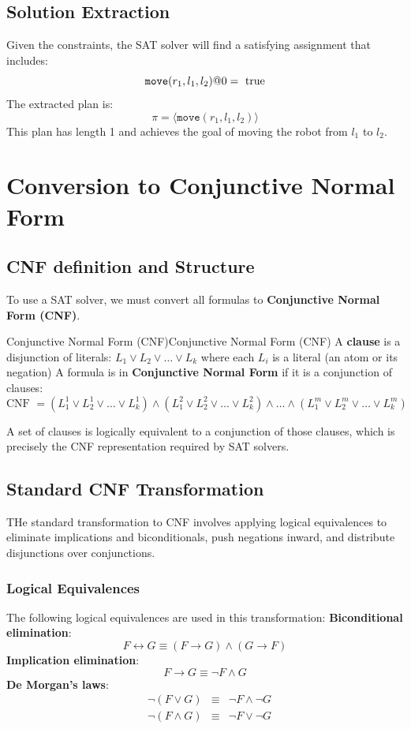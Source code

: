 \documentclass[a4paper]{article}
\theoremstyle{definition}
\begin{document}
\subsection{Solution Extraction}
Given the constraints, the SAT solver will find a satisfying assignment that includes:
\[
  \texttt{move}(r_1,l_1,l_2)\symbol{64}0 = \text{ true}
\]
The extracted plan is:
\[
  \pi = \langle \texttt{move}(r_1,l_1,l_2) \rangle
\]
This plan has length 1 and achieves the goal of moving the robot from \( l_1 \) to \( l_2 \).
\section{Conversion to Conjunctive Normal Form}
\subsection{CNF definition and Structure}
To use a SAT solver, we must convert all formulas to \textbf{Conjunctive Normal Form (CNF)}.
\begin{definition}{Conjunctive Normal Form (CNF)}{Conjunctive Normal Form (CNF)}
A \textbf{clause} is a disjunction of literals: \( L_1 \vee L_2 \vee \ldots \vee L_k \) where 
each \( L_i \) is a literal (an atom or its negation)
\vspace{1em}
\noindent
\newline
A formula is in \textbf{Conjunctive Normal Form} if it is a conjunction of clauses:
\[
  \text{CNF } = (L_1^1 \vee L_2^1 \vee \ldots \vee L_k^1) \wedge (L_1^2 \vee L_2^2 \vee \ldots \vee L_k^2) \wedge \ldots \wedge (L_1^m \vee L_2^m \vee \ldots \vee L_k^m)
\]
\end{definition}
A set of clauses is logically equivalent to a conjunction of those clauses, which is precisely the CNF representation 
required by SAT solvers.
\subsection{Standard CNF Transformation}
THe standard transformation to CNF involves applying logical equivalences to eliminate implications and biconditionals,
push negations inward, and distribute disjunctions over conjunctions.
\subsubsection{Logical Equivalences}
The following logical equivalences are used in this transformation:
\vspace{1em}
\noindent
\newline
\textbf{Biconditional elimination}:
\[
  F \leftrightarrow G \equiv (F \rightarrow G) \wedge (G \rightarrow F)
\]
\vspace{1em}
\noindent
\newline
\textbf{Implication elimination}:
\[
  F \rightarrow G \equiv \lnot F \wedge G 
\]
\vspace{1em}
\noindent
\newline
\textbf{De Morgan's laws}:
\begin{align*}
    & \lnot(F \vee G) & \equiv & \lnot F \wedge \lnot G \\
    & \lnot(F \wedge G) & \equiv & \lnot F \vee \lnot G \\
\end{align*}
\end{document}
